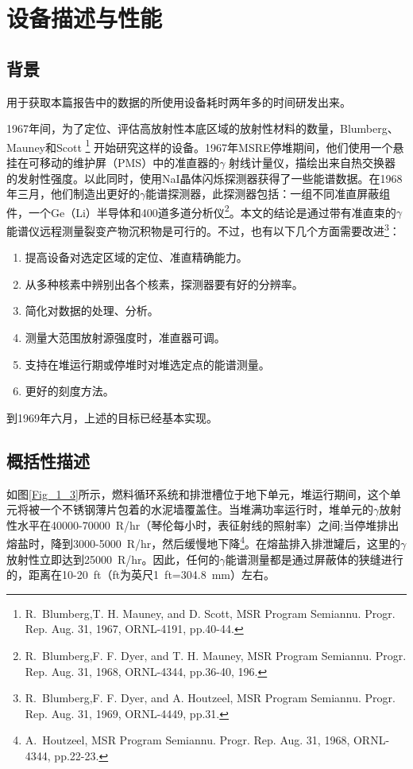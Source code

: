 \chapter{设备描述与性能}
\section{背景}
用于获取本篇报告中的数据的所使用设备耗时两年多的时间研发出来。

1967年间，为了定位、评估高放射性本底区域的放射性材料的数量，Blumberg、\newline Mauney和Scott \footnote{R.\ Blumberg,T. H. Mauney, and D. Scott, MSR Program Semiannu. Progr. Rep. Aug. 31, 1967, ORNL-4191, pp.40-44.} 开始研究这样的设备。1967年MSRE停堆期间，他们使用一个悬挂在可移动的维护屏（PMS）中的准直器的$\gamma$ 射线计量仪，描绘出来自热交换器的发射性强度。以此同时，使用NaI晶体闪烁探测器获得了一些能谱数据。在1968年三月，他们制造出更好的$\gamma$能谱探测器，此探测器包括：一组不同准直屏蔽组件，一个Ge（Li）半导体和400道多道分析仪\footnote{R.\ Blumberg,F. F. Dyer, and T. H. Mauney, MSR Program Semiannu. Progr. Rep. Aug. 31, 1968, ORNL-4344, pp.36-40, 196.}。本文的结论是通过带有准直束的$\gamma$ 能谱仪远程测量裂变产物沉积物是可行的。不过，也有以下几个方面需要改进\footnote{R.\ Blumberg,F. F. Dyer, and A. Houtzeel, MSR Program Semiannu. Progr. Rep. Aug. 31, 1969, ORNL-4449, pp.31.}：
\begin{enumerate}
\item 提高设备对选定区域的定位、准直精确能力。
\item 从多种核素中辨别出各个核素，探测器要有好的分辨率。
\item 简化对数据的处理、分析。
\item 测量大范围放射源强度时，准直器可调。
\item 支持在堆运行期或停堆时对堆选定点的能谱测量。
\item 更好的刻度方法。
\end{enumerate}
\noindent 到1969年六月，上述的目标已经基本实现。

\section{概括性描述}
如图\ref{Fig_1_3}所示，燃料循环系统和排泄槽位于地下单元，堆运行期间，这个单元将被一个不锈钢薄片包着的水泥墙覆盖住。当堆满功率运行时，堆单元的$\gamma$放射性水平在40000-70000\ R/hr（琴伦每小时，表征射线的照射率）之间;当停堆排出熔盐时，降到3000-5000\ R/hr，然后缓慢地下降\footnote{A.\ Houtzeel, MSR Program Semiannu. Progr. Rep. Aug. 31, 1968, ORNL-4344, pp.22-23.}。在熔盐排入排泄罐后，这里的$\gamma$放射性立即达到25000\ R/hr。因此，任何的$\gamma$能谱测量都是通过屏蔽体的狭缝进行的，距离在10-20\ ft（ft为英尺1\ ft=304.8\ mm）左右。

